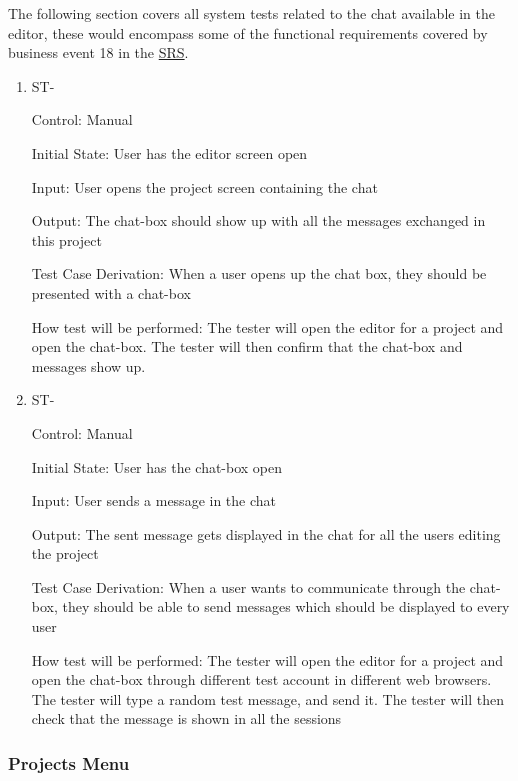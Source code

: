 \documentclass[12pt, titlepage]{article}
\newcounter{TESTID}
\newcommand\TESTNUM{\stepcounter{TESTID}\theTESTID}
\begin{document}
	The following section covers all system tests related to the chat available in the editor, these would encompass some of the functional requirements covered by business event 18 in the \href{https://github.com/RutheniumVI/UnderTree/blob/main/docs/SRS/SRS.pdf}{SRS}.
	
	\begin{enumerate}
		\item{ST-\TESTNUM\\}
		
		Control: Manual
		
		Initial State: User has the editor screen open
		
		Input: User opens the project screen containing the chat
		
		Output: The chat-box should show up with all the messages exchanged in this project
		
		Test Case Derivation: When a user opens up the chat box, they should be presented with a chat-box
		
		How test will be performed: The tester will open the editor for a project and open the chat-box. The tester will then confirm that the chat-box and messages show up.
		
		\item{ST-\TESTNUM\\}
		
		Control: Manual
		
		Initial State: User has the chat-box open
		
		Input: User sends a message in the chat
		
		Output: The sent message gets displayed in the chat for all the users editing the project
		
		Test Case Derivation: When a user wants to communicate through the chat-box, they should be able to send messages which should be displayed to every user
		
		How test will be performed: The tester will open the editor for a project and open the chat-box through different test account in different web browsers. The tester will type a random test message, and send it. The tester will then check that the message is shown in all the sessions
		
	\end{enumerate}
	
	\subsubsection{Projects Menu}
	
\end{document}
